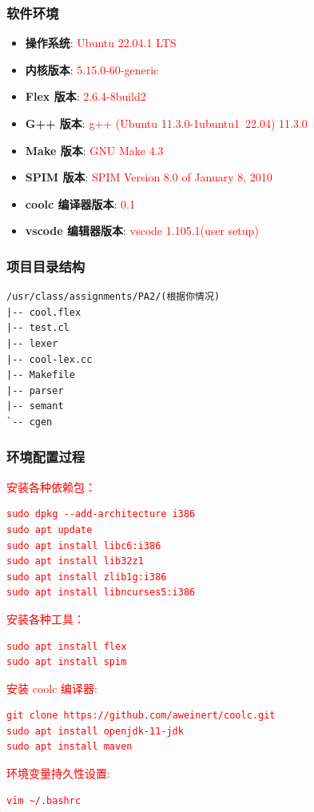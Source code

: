 \documentclass[twocolumn]{article}
\begin{document}
\subsubsection{软件环境}
\begin{itemize}
    \item \textbf{操作系统}: \textcolor{red}{Ubuntu 22.04.1 LTS}
    \item \textbf{内核版本}: \textcolor{red}{5.15.0-60-generic}
    \item \textbf{Flex 版本}: \textcolor{red}{2.6.4-8build2}
    \item \textbf{G++ 版本}: \textcolor{red}{g++ (Ubuntu 11.3.0-1ubuntu1~22.04) 11.3.0}
    \item \textbf{Make 版本}: \textcolor{red}{GNU Make 4.3}
    \item \textbf{SPIM 版本}: \textcolor{red}{SPIM Version 8.0 of January 8, 2010}
    \item \textbf{coolc 编译器版本}: \textcolor{red}{0.1}
    \item \textbf{vscode 编辑器版本}: \textcolor{red}{vscode 1.105.1(user setup)}
\end{itemize}

\subsubsection{项目目录结构}
\textcolor{red}{%
}
\begin{verbatim}
/usr/class/assignments/PA2/(根据你情况)
|-- cool.flex       
|-- test.cl           
|-- lexer             
|-- cool-lex.cc       
|-- Makefile           
|-- parser             
|-- semant            
`-- cgen              
\end{verbatim}

\subsubsection{环境配置过程}

\textcolor{red}{
安装各种依赖包：
\begin{verbatim}
sudo dpkg --add-architecture i386 
sudo apt update 
sudo apt install libc6:i386 
sudo apt install lib32z1 
sudo apt install zlib1g:i386 
sudo apt install libncurses5:i386
\end{verbatim}

安装各种工具：
\begin{verbatim}
sudo apt install flex
sudo apt install spim
\end{verbatim}

安装 coolc 编译器:
\begin{verbatim}
git clone https://github.com/aweinert/coolc.git
sudo apt install openjdk-11-jdk
sudo apt install maven
\end{verbatim}

环境变量持久性设置:
\begin{verbatim}
vim ~/.bashrc
\end{verbatim}
}
\end{document}
